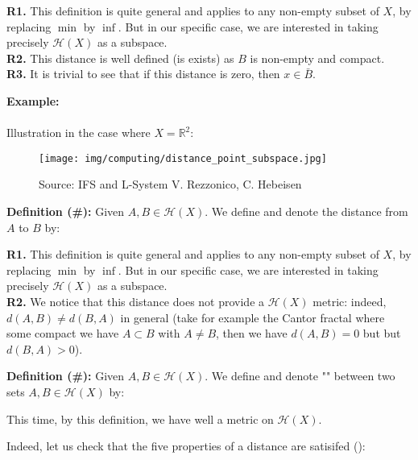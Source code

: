 	\begin{tcolorbox}[title=Remarks,colframe=black,arc=10pt]
	\textbf{R1.} This definition is quite general and applies to any non-empty subset of $X$, by replacing $\min$ by $\inf$. But in our specific case, we are interested in taking precisely $\mathcal{H}(X)$ as a subspace.\\
	
	\textbf{R2.} This distance is well defined (is exists) as $B$ is non-empty and compact.\\
	
	\textbf{R3.} It is trivial to see that if this distance is zero, then $x\in\bar{B}$.
	\end{tcolorbox}
	\begin{tcolorbox}[colframe=black,colback=white,sharp corners]
	\textbf{{\Large {}}Example:}\\\\
	Illustration in the case where $X=\mathbb{R}^2$:
	\begin{figure}[H]
		\centering
		\texttt{[image: img/computing/distance\_point\_subspace.jpg]}
		\caption{Source: IFS and L-System V. Rezzonico, C. Hebeisen}
	\end{figure}
	\end{tcolorbox}
	\textbf{Definition (\#\mydef):} Given $A,B\in\mathcal{H}(X)$. We define and denote the distance from $A$ to $B$ by:
	
	\begin{tcolorbox}[title=Remarks,colframe=black,arc=10pt]
	\textbf{R1.} This definition is quite general and applies to any non-empty subset of $X$, by replacing $\min$ by $\inf$. But in our specific case, we are interested in taking precisely $\mathcal{H}(X)$ as a subspace.\\
	
	\textbf{R2.} We notice that this distance does not provide a $\mathcal{H}(X)$ metric: indeed, $d(A,B)\neq d(B,A)$ in general (take for example the Cantor fractal where some compact we have $A\subset B$ with $A\neq B$, then we have $d(A, B) = 0$ but but $d(B,A)>0$).
	\end{tcolorbox}
	\textbf{Definition (\#\mydef):} Given $A,B\in\mathcal{H}(X)$. We define and denote "" between two sets $A,B\in \mathcal{H}(X)$ by:
	
	This time, by this definition, we have well a metric on $\mathcal{H}(X)$.

	Indeed, let us check that the five properties of a distance are satisifed ():
	
